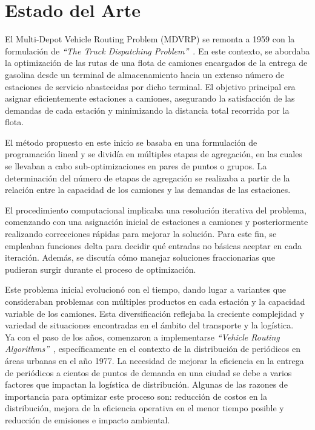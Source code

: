 \documentclass[letter, 10pt]{article}
\begin{document}
\section{Estado del Arte}

El Multi-Depot Vehicle Routing Problem (MDVRP) se remonta a 1959 con la formulación de \textit{``The Truck Dispatching Problem''}~\cite{TruckDispatchingProblem}. En este contexto, se abordaba la optimización de las rutas de una flota de camiones encargados de la entrega de gasolina desde un terminal de almacenamiento hacia un extenso número de estaciones de servicio abastecidas por dicho terminal. El objetivo principal era asignar eficientemente estaciones a camiones, asegurando la satisfacción de las demandas de cada estación y minimizando la distancia total recorrida por la flota.

El método propuesto en este inicio se basaba en una formulación de programación lineal y se dividía en múltiples etapas de agregación, en las cuales se llevaban a cabo sub-optimizaciones en pares de puntos o grupos. La determinación del número de etapas de agregación se realizaba a partir de la relación entre la capacidad de los camiones y las demandas de las estaciones.

El procedimiento computacional implicaba una resolución iterativa del problema, comenzando con una asignación inicial de estaciones a camiones y posteriormente realizando correcciones rápidas para mejorar la solución. Para este fin, se empleaban funciones delta para decidir qué entradas no básicas aceptar en cada iteración. Además, se discutía cómo manejar soluciones fraccionarias que pudieran surgir durante el proceso de optimización.

Este problema inicial evolucionó con el tiempo, dando lugar a variantes que consideraban problemas con múltiples productos en cada estación y la capacidad variable de los camiones. Esta diversificación reflejaba la creciente complejidad y variedad de situaciones encontradas en el ámbito del transporte y la logística.
\\

Ya con el paso de los años, comenzaron a implementarse \textit{``Vehicle Routing Algorithms''}~\cite{ImplementingVRAlgorithms}, específicamente en el contexto de la distribución de periódicos en áreas urbanas en el año 1977. La necesidad de mejorar la eficiencia en la entrega de periódicos a cientos de puntos de demanda en una ciudad se debe a varios factores que impactan la logística de distribución. Algunas de las razones de importancia para optimizar este proceso son: reducción de costos en la distribución, mejora de la eficiencia operativa en el menor tiempo posible y reducción de emisiones e impacto ambiental.
\end{document}
